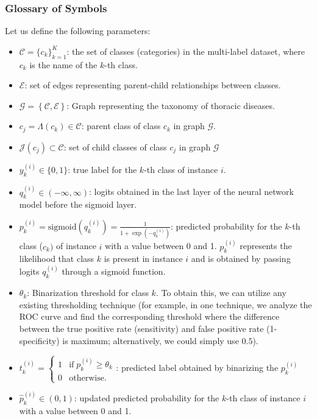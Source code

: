 \documentclass[review,1p,times,numbers]{elsarticle}
\begin{document}
\subsubsection{Glossary of Symbols}\label{subsubsec:notations}
Let us define the following parameters:
\begin{itemize}
    \item  $\mathcal{C} = {\{c_k\}}_{k=1}^{K}  $: the set of classes (categories) in the multi-label dataset, where $c_k $ is the name of the $k $-th class.
    \item  $\mathcal{E} $: set of edges representing parent-child relationships between classes.
    \item  $\mathcal{G}=\left\{\mathcal{C},\mathcal{E}\right\} $:  Graph representing the taxonomy of thoracic diseases.
    \item  $c_j=\Lambda (c_k) \in \mathcal{C}$: parent class of class $c_k $ in graph $\mathcal{G} $.
    \item  $\mathcal{J}(c_j) \subset \mathcal{C}$: set of child classes of class $c_j$ in graph $\mathcal{G} $
    \item  $y_k^{(i)} \in \{0,1\} $: true label for the $k $-th class of instance $i $.
    \item  $q_k^{(i)} \in \left( -\infty,\infty \right) $: logits obtained in the last layer of the neural network model before the sigmoid layer.
    \item  $p_k^{(i)} = \text{sigmoid}\left(q_k^{(i)}\right) = \frac{1}{1+\exp{\left(-q_k^{(i)}\right)}} $: predicted probability for the $k $-th class ($c_k) $ of instance $i $ with a value between 0 and 1. $p_k^{(i)} $ represents the likelihood that class $k $ is present in instance $i $ and is obtained by passing logits $q_k^{(i)} $ through a sigmoid function.
    \item  $\theta_k $: Binarization threshold for class $k $.  To obtain this, we can utilize any existing thresholding technique (for example, in one technique, we analyze the ROC curve and find the corresponding threshold where the difference between the true positive rate (sensitivity) and false positive rate (1-specificity) is maximum; alternatively, we could simply use $0.5 $).
    \item  $t_k^{(i)}=\left\{\begin{array}{ll}1&\text{if}\;p_k^{(i)} \geq \theta_k\\0&\text{otherwise.}\end{array}\right. $: predicted label obtained by binarizing the $p_k^{(i)} $
    \item  ${\widehat p}_k^{(i)} \in (0,1) $: updated predicted probability for the $k $-th class of instance $i $ with a value between 0 and 1.

\end{itemize}
\end{document}
